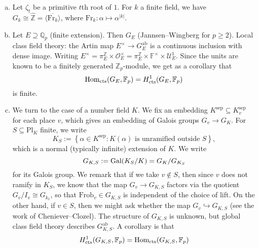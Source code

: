 \documentclass[reqno]{amsart} 
\begin{document}
\begin{example}
\begin{enumerate}[(a)]
  \item\label{enumerate:cq6r3g5d9c} Let $\zeta_t$ be a primitive $t$th root of $1$.  For $k$ a finite field, we have $G_k \cong \hat{\mathbb{Z}} = \overline{\langle \mathrm{Fr}_k \rangle}$, where $\mathrm{Fr}_k : \alpha \mapsto \alpha^{\lvert k \rvert}$.
  \item\label{enumerate:cq6r3g5e7y} Let $E \supseteq \mathbb{Q}_p$ (finite extension).  Then $G_E$ (Jannsen--Wingberg for $p \geq 2$).  Local class field theory: the Artin map $E^\times \rightarrow G_E^{\mathrm{ab}}$ is a continuous inclusion with dense image.  Writing $E^\times = \pi_E^{\mathbb{Z}} \times \mathcal{O}_E^\times = \pi_E^{\mathbb{Z}} \times \mathbb{F}^\times \times \mathcal{U}_E^1$.  Since the units are known to be a finitely generated $\mathbb{Z}_p$-module, we get as a corollary that
    \begin{equation*}
      \operatorname{Hom}_{\mathrm{cts}}(G_E, \mathbb{F}_p) = H^1_{\mathrm{cts}}(G_E, \mathbb{F}_p)
    \end{equation*}
    is finite.
  \item\label{enumerate:cq6r3g5cxb} We turn to the case of a number field $K$.  We fix an embedding $K^{\mathrm{sep}} \subseteq K_v^{\mathrm{sep}}$ for each place $v$, which gives an embedding of Galois groups $G_v \rightarrow G_K$.  For $S \subseteq \mathrm{P l}_K$ finite, we write
    \begin{equation*}
      K_S := \left\{ \alpha \in K^{\mathrm{sep}} : K(\alpha) \text{ is unramified outside } S \right\},
    \end{equation*}
    which is a normal (typically infinite) extension of $K$.  We write
    \begin{equation*}
      G_{K, S} := \operatorname{Gal}(K_S / K) = G_K / G_{K_S}
    \end{equation*}
    for its Galois group.  We remark that if we take $v \notin S$, then since $v$ does not ramify in $K_S$, we know that the map $G_v \rightarrow G_{K, S}$ factors via the quotient $G_v / I_v \cong G_{k_v}$, so that $\mathrm{Frob}_v \in G_{K, S}$ is independent of the choice of lift.  On the other hand, if $v \in S$, then we might ask whether the map $G_v \hookrightarrow G_{K, S}$ (see the work of Cheniever--Clozel).  The structure of $G_{K, S}$ is unknown, but global class field theory describes $G_{K, S}^{\mathrm{ab}}$.  A corollary is that
    \begin{equation*}
      H^{1}_{\mathrm{cts}}(G_{K, S}, \mathbb{F}_p) = \operatorname{Hom}_{\mathrm{cts}}(G_{K, S}, \mathbb{F}_p)
    \end{equation*}

\end{enumerate}
\end{example}
\end{document}
